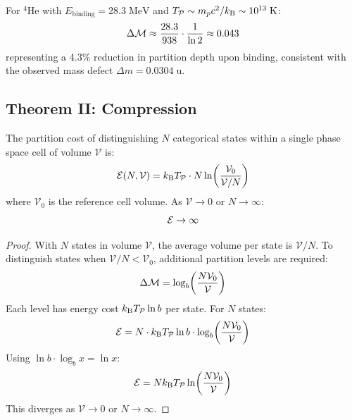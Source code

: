 \begin{example}
For $^4$He with $E_{\mathrm{binding}} = 28.3\;\mathrm{MeV}$ and $T_{\mathcal{P}} \sim m_p c^2/k_{\mathrm{B}} \sim 10^{13}\;\mathrm{K}$:
\begin{equation}
    \Delta\mathcal{M} \approx \frac{28.3}{938} \cdot \frac{1}{\ln 2} \approx 0.043
\end{equation}
representing a 4.3\% reduction in partition depth upon binding, consistent with the observed mass defect $\Delta m = 0.0304\;\mathrm{u}$.
\end{example}

\subsection{Theorem II: Compression}

\begin{theorem}
\label{thm:compression}
The partition cost of distinguishing $N$ categorical states within a single phase space cell of volume $\mathcal{V}$ is:
\begin{equation}
    \mathcal{E}(N, \mathcal{V}) = k_{\mathrm{B}} T_{\mathcal{P}} \cdot N \ln\!\left(\frac{\mathcal{V}_0}{\mathcal{V}/N}\right)
\end{equation}
where $\mathcal{V}_0$ is the reference cell volume. As $\mathcal{V} \to 0$ or $N \to \infty$:
\begin{equation}
    \mathcal{E} \to \infty
\end{equation}
\end{theorem}

\begin{proof}
With $N$ states in volume $\mathcal{V}$, the average volume per state is $\mathcal{V}/N$. To distinguish states when $\mathcal{V}/N < \mathcal{V}_0$, additional partition levels are required:
\begin{equation}
    \Delta\mathcal{M} = \log_b\!\left(\frac{N\mathcal{V}_0}{\mathcal{V}}\right)
\end{equation}
Each level has energy cost $k_{\mathrm{B}} T_{\mathcal{P}} \ln b$ per state. For $N$ states:
\begin{equation}
    \mathcal{E} = N \cdot k_{\mathrm{B}} T_{\mathcal{P}} \ln b \cdot \log_b\!\left(\frac{N\mathcal{V}_0}{\mathcal{V}}\right)
\end{equation}
Using $\ln b \cdot \log_b x = \ln x$:
\begin{equation}
    \mathcal{E} = N k_{\mathrm{B}} T_{\mathcal{P}} \ln\!\left(\frac{N\mathcal{V}_0}{\mathcal{V}}\right)
\end{equation}
This diverges as $\mathcal{V} \to 0$ or $N \to \infty$.
\end{proof}

